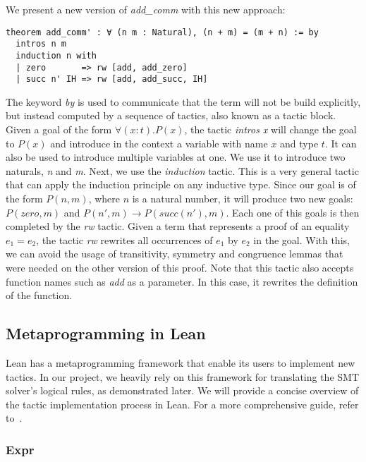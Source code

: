 We present a new version of \textit{add\_comm} with this new approach:

\begin{verbatim}
theorem add_comm' : ∀ (n m : Natural), (n + m) = (m + n) := by
  intros n m
  induction n with
  | zero       => rw [add, add_zero]
  | succ n' IH => rw [add, add_succ, IH]
\end{verbatim}

The keyword \textit{by} is used to communicate that the term will not be build explicitly, but instead computed by a sequence of tactics, also known as a tactic block. Given a goal of the form $\forall (x : t) . P(x)$, the tactic \textit{intros x} will change the goal to $P(x)$ and introduce in the context a variable with name $x$ and type $t$. It can also be used to introduce multiple variables at one. We use it to introduce two naturals, \textit{n} and \textit{m}. Next, we use the \textit{induction} tactic. This is a very general tactic that can apply the induction principle on any inductive type. Since our goal is of the form $P(n, m)$, where $n$ is a natural number, it will produce two new goals: $P(zero, m)$ and $P(n', m) \rightarrow P(succ(n'), m)$. Each one of this goals is then completed by the \textit{rw} tactic. Given a term that represents a proof of an equality $e_{1} = e_{2}$, the tactic \textit{rw} rewrites all occurrences of $e_{1}$ by $e_{2}$ in the goal. With this, we can avoid the usage of transitivity, symmetry and congruence lemmas that were needed on the other version of this proof. Note that this tactic also accepts function names such as \textit{add} as a parameter. In this case, it rewrites the definition of the function.

\subsection{Metaprogramming in Lean}

Lean has a metaprogramming framework that enable its users to implement new tactics. In our project, we heavily rely on this framework for translating the SMT solver's logical rules, as demonstrated later. We will provide a concise overview of the tactic implementation process in Lean. For a more comprehensive guide, refer to~\cite{metaLean}.

\subsubsection{Expr}



